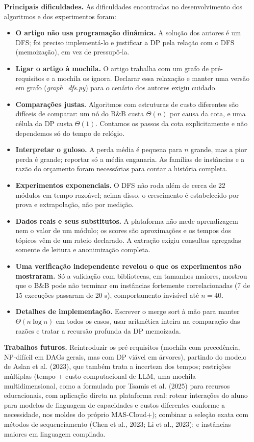 \documentclass[12pt,a4paper]{article}
\begin{document}
\textbf{Principais dificuldades.} As dificuldades encontradas no desenvolvimento dos algoritmos e dos experimentos foram:
\begin{itemize}[leftmargin=*,itemsep=0.3em]
\item \textbf{O artigo não usa programação dinâmica.} A solução dos autores é um DFS; foi preciso implementá-lo e justificar a DP pela relação com o DFS (memoização), em vez de pressupô-la.
\item \textbf{Ligar o artigo à mochila.} O artigo trabalha com um grafo de pré-requisitos e a mochila os ignora. Declarar essa relaxação e manter uma versão em grafo (\textit{graph\_dfs.py}) para o cenário dos autores exigiu cuidado.
\item \textbf{Comparações justas.} Algoritmos com estruturas de custo diferentes são difíceis de comparar: um nó do B\&B custa $\Theta(n)$ por causa da cota, e uma célula da DP custa $\Theta(1)$. Contamos os passos da cota explicitamente e não dependemos só do tempo de relógio.
\item \textbf{Interpretar o guloso.} A perda média é pequena para $n$ grande, mas a pior perda é grande; reportar só a média enganaria. As famílias de instâncias e a razão do orçamento foram necessárias para contar a história completa.
\item \textbf{Experimentos exponenciais.} O DFS não roda além de cerca de 22 módulos em tempo razoável; acima disso, o crescimento é estabelecido por prova e extrapolação, não por medição.
\item \textbf{Dados reais e seus substitutos.} A plataforma não mede aprendizagem nem o valor de um módulo; os scores são aproximações e os tempos dos tópicos vêm de um rateio declarado. A extração exigiu consultas agregadas somente de leitura e anonimização completa.
\item \textbf{Uma verificação independente revelou o que os experimentos não mostraram.} Só a validação com bibliotecas, em tamanhos maiores, mostrou que o B\&B pode não terminar em instâncias fortemente correlacionadas (7 de 15 execuções passaram de 20 s), comportamento invisível até $n = 40$.
\item \textbf{Detalhes de implementação.} Escrever o merge sort à mão para manter $\Theta(n \log n)$ em todos os casos, usar aritmética inteira na comparação das razões e tratar a recursão profunda da DP memoizada.
\end{itemize}

\textbf{Trabalhos futuros.} Reintroduzir os pré-requisitos (mochila com precedência, NP-difícil em DAGs gerais, mas com DP viável em árvores), partindo do modelo de Aslan et al. (2023), que também trata a incerteza dos tempos; restrições múltiplas (tempo + custo computacional de LLM, uma mochila multidimensional, como a formulada por Tsamis et al. (2025) para recursos educacionais, com aplicação direta na plataforma real: rotear interações do aluno para modelos de linguagem de capacidades e custos diferentes conforme a necessidade, nos moldes do próprio MAS-Cloud+); combinar a seleção exata com métodos de sequenciamento (Chen et al., 2023; Li et al., 2023); e instâncias maiores em linguagem compilada.
\end{document}
